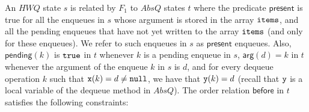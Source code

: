 An $\mathit{HWQ}$ state $s$ is related by $F_1$ to $AbsQ$ states $t$ where the predicate
$\mathsf{present}$ is true for all the enqueues in $s$ whose argument is stored in the array ${\tt items}$, and all the pending enqueues that have not yet written to the array ${\tt items}$ (and only for these enqueues). We refer to such enqueues in $s$ as $\mathsf{present}$ enqueues. Also, $\mathsf{pending}(k)$ is ${\tt true}$ in $t$ whenever $k$ is a pending enqueue in $s$, $\mathsf{arg}(d)=k$ in $t$ whenever the argument of the enqueue $k$ in $s$ is $d$, and for every dequeue operation $k$ such that ${\tt x}(k)=d\neq {\tt null}$, we have that ${\tt y}(k)=d$ (recall that ${\tt y}$ is a local variable of the dequeue method in $AbsQ$). The order relation $\mathsf{before}$ in $t$ satisfies the following constraints:
\vspace{-2mm}
